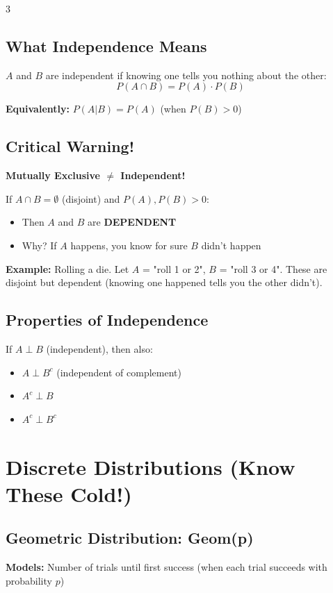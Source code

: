 \documentclass[10pt,landscape]{article}
\begin{document}
\begin{multicols}{3}
\subsection{What Independence Means}
$A$ and $B$ are independent if knowing one tells you nothing about the other:
$$P(A \cap B) = P(A) \cdot P(B)$$

\textbf{Equivalently:} $P(A|B) = P(A)$ (when $P(B) > 0$)

\subsection{Critical Warning!}
\textbf{Mutually Exclusive $\neq$ Independent!}

If $A \cap B = \emptyset$ (disjoint) and $P(A), P(B) > 0$:
\begin{itemize}[leftmargin=*,noitemsep,topsep=0pt]
\item Then $A$ and $B$ are \textbf{DEPENDENT}
\item Why? If $A$ happens, you know for sure $B$ didn't happen
\end{itemize}

\textbf{Example:} Rolling a die. Let $A$ = "roll 1 or 2", $B$ = "roll 3 or 4". These are disjoint but dependent (knowing one happened tells you the other didn't).

\subsection{Properties of Independence}
If $A \perp B$ (independent), then also:
\begin{itemize}[leftmargin=*,noitemsep,topsep=0pt]
\item $A \perp B^c$ (independent of complement)
\item $A^c \perp B$
\item $A^c \perp B^c$
\end{itemize}

\section{Discrete Distributions (Know These Cold!)}

\subsection{Geometric Distribution: Geom(p)}
\textbf{Models:} Number of trials until first success (when each trial succeeds with probability $p$)


\end{multicols}
\end{document}
